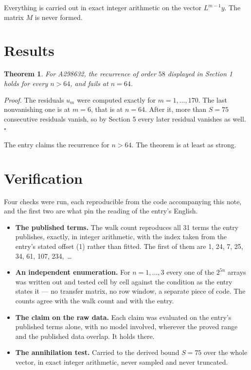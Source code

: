 \documentclass[11pt]{article}
\newtheorem{theorem}{Theorem}
\theoremstyle{definition}
\begin{document}
Everything is carried out in exact integer arithmetic on the vector $L^{m-1}y$. The matrix $M$ is never formed.

\section{Results}

\begin{theorem} For A298632, the recurrence of order $58$ displayed in Section 1 holds for every $n > 64$, and fails at $n = 64$.\end{theorem}

{\itshape Proof.} The residuals $u_m$ were computed exactly for $m = 1,\dots,170$. The last nonvanishing one is at $m = 6$, that is at $n = 64$. After it, more than $S = 75$ consecutive residuals vanish, so by Section 5 every later residual vanishes as well. $\square$

The entry claims the recurrence for $n > 64$. The theorem is at least as strong.

\section{Verification}

Four checks were run, each reproducible from the code accompanying this note, and the first two are what pin the reading of the entry's English.

\begin{itemize}

\item {\bfseries The published terms.} The walk count reproduces all 31 terms the entry publishes, exactly, in integer arithmetic, with the index taken from the entry's stated offset (1) rather than fitted. The first of them are 1, 24, 7, 25, 34, 61, 107, 234,~\dots

\item {\bfseries An independent enumeration.} For $n = 1,\dots,3$ every one of the $2^{5n}$ arrays was written out and tested cell by cell against the condition as the entry states it --- no transfer matrix, no row window, a separate piece of code. The counts agree with the walk count and with the entry.

\item {\bfseries The claim on the raw data.} Each claim was evaluated on the entry's published terms alone, with no model involved, wherever the proved range and the published data overlap. It holds there.

\item {\bfseries The annihilation test.} Carried to the derived bound $S = 75$ over the whole vector, in exact integer arithmetic, never sampled and never truncated.

\end{itemize}
\end{document}
